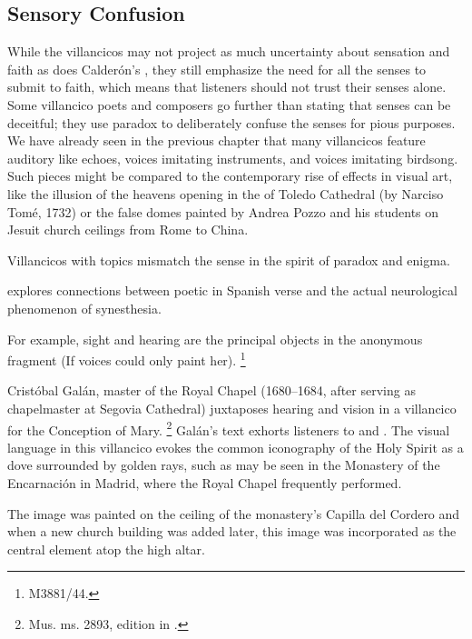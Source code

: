 \subsection{Sensory Confusion}

While the  villancicos may not project as much 
uncertainty about sensation and faith as does Calderón's , they still emphasize the need for all the senses to submit 
to faith, which means that listeners should not trust their senses alone.
Some villancico poets and composers go further than stating that senses can be 
deceitful; they use paradox to deliberately confuse the senses for pious 
purposes.
We have already seen in the previous chapter that many villancicos feature 
auditory  like echoes, voices imitating instruments, 
and voices imitating birdsong.
Such pieces might be compared to the contemporary rise of  
effects in visual art, like the illusion of the heavens opening in the 
 of Toledo Cathedral (by Narciso Tomé, 1732) or the false 
domes painted by Andrea Pozzo and his students on Jesuit church ceilings from 
Rome to China.%
    \Autocites[]{GroveArt}[110]{Bailey:Art}

Villancicos with  topics mismatch the sense in the spirit 
of paradox and enigma.%
\begin{Footnote}
    \Autocite{DoetschKraus:Sinestesia} explores connections between poetic 
     in Spanish verse and the actual neurological 
    phenomenon of synesthesia.
\end{Footnote}
For example, sight and hearing are the principal objects in the anonymous 
fragment  (If voices could 
only paint her).%
\footnote{\signature{E-Mn}{M3881/44}.}

Cristóbal Galán, master of the Royal Chapel (1680--1684, after serving as 
chapelmaster at Segovia Cathedral) juxtaposes hearing and vision in a 
villancico for the Conception of Mary.%
    \footnote{\signature{D-Mbs}{Mus. ms. 2893}, edition in 
\autocite[567--568]{CaberoPueyo:PhD}.}
Galán's text exhorts listeners to  and .
The visual language in this villancico evokes the common iconography of the 
Holy Spirit as a dove surrounded by golden rays, such as may be seen in the 
Monastery of the Encarnación in Madrid, where the Royal Chapel frequently 
performed.%
\begin{Footnote}
    The image was painted on the ceiling of the monastery's Capilla del Cordero 
    and when a new church building was added later, this image was incorporated as 
    the central element atop the high altar.%
    \Autocite[69--70, 81]{Sanz:GuiaDescalzasEncarnacion}
\end{Footnote}

